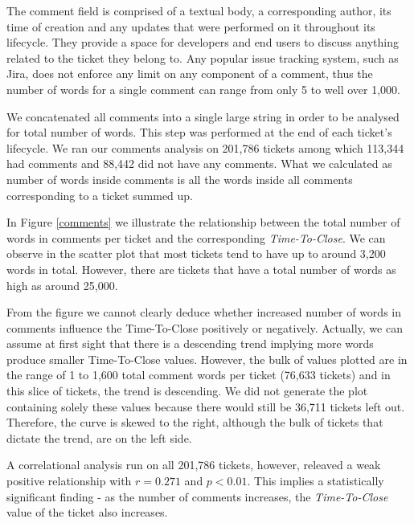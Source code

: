\documentclass{mpaper}
\begin{document}
The comment field is comprised of a textual body, a corresponding author, its time of creation and any updates 
that were performed on it throughout its lifecycle. They provide a space for developers and end users to discuss 
anything related to the ticket they belong to. Any popular issue tracking system, such as Jira, does not enforce 
any limit on any component of a comment, thus the number of words for a single comment can range from only 5 
to well over 1,000. 

We concatenated all comments into a single large string in order to be analysed for total number of words. This step 
was performed at the end of each ticket's lifecycle. We ran our comments analysis on 201,786 tickets among which 
113,344 had comments and 88,442 did not have any comments. What we calculated as number of words inside comments 
is all the words inside all comments corresponding to a ticket summed up.

In Figure \ref{comments} we illustrate the relationship between the total number of words in comments per ticket and 
the corresponding \emph{Time-To-Close}. We can observe in the scatter plot that most tickets tend to 
have up to around 3,200 words in total. However, there are tickets that have a total number of words as high as 
around 25,000. 

From the figure we cannot clearly deduce whether increased number of words in comments influence 
the Time-To-Close positively or negatively. Actually, we can assume at first sight that there is a descending trend implying more 
words produce smaller Time-To-Close values. However, the bulk of values plotted are in the range of 
1 to 1,600 total comment words per ticket (76,633 tickets) and in this slice of tickets, the trend is descending.
We did not generate the plot containing solely these values because there would still be 36,711 tickets left out. 
Therefore, the curve is skewed to the right, although the bulk of tickets that dictate the trend, are on the left side.

A correlational analysis run on all 201,786 tickets, however, releaved a weak positive relationship with $r = 0.271$ and $p < 0.01$. 
This implies a statistically significant finding - as the number of comments increases, the \emph{Time-To-Close} value of the ticket 
also increases. 
\end{document}
